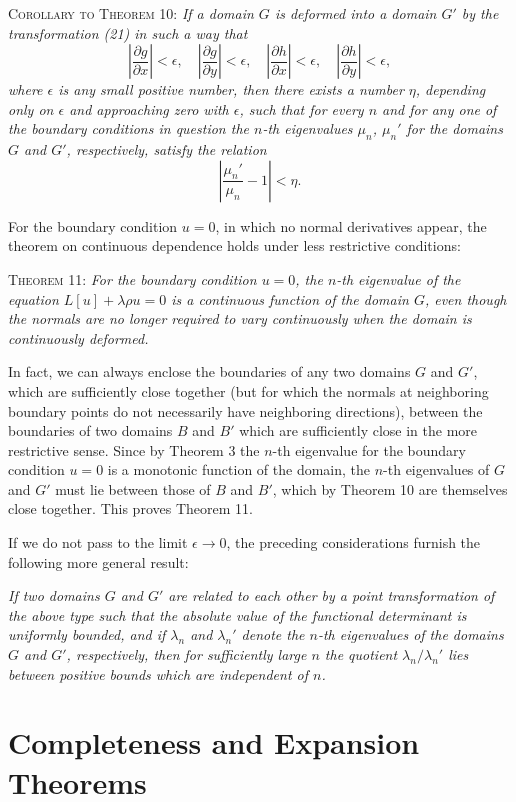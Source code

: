 \textsc{Corollary to Theorem 10:} \emph{If a domain $G$ is deformed into a domain $G'$ by the transformation (21) in such a way that}
\[
\left|\frac{\partial g}{\partial x}\right|<\epsilon,
\quad\left|\frac{\partial g}{\partial y}\right|<\epsilon,
\quad\left|\frac{\partial h}{\partial x}\right|<\epsilon,
\quad\left|\frac{\partial h}{\partial y}\right|<\epsilon,
\]
\emph{where $\epsilon$ is any small positive number, then there exists a number $\eta$, depending only on $\epsilon$ and approaching zero with $\epsilon$, such that for every $n$ and for any one of the boundary conditions in question the $n$-th eigenvalues $\mu_n$, $\mu_n'$ for the domains $G$ and $G'$, respectively, satisfy the relation}
\[
\left|\frac{\mu_n'}{\mu_n}-1\right|<\eta.
\]

For the boundary condition $u=0$, in which no normal derivatives appear, the theorem on continuous dependence holds under less restrictive conditions:

\textsc{Theorem 11:} \emph{For the boundary condition $u=0$, the $n$-th eigenvalue of the equation $L[u]+\lambda\rho u=0$ is a continuous function of the domain $G$, even though the normals are no longer required to vary continuously when the domain is continuously deformed.}

In fact, we can always enclose the boundaries of any two domains $G$ and $G'$, which are sufficiently close together (but for which the normals at neighboring boundary points do not necessarily have neighboring directions), between the boundaries of two domains $B$ and $B'$ which are sufficiently close in the more restrictive sense. Since by Theorem 3 the $n$-th eigenvalue for the boundary condition $u=0$ is a monotonic function of the domain, the $n$-th eigenvalues of $G$ and $G'$ must lie between those of $B$ and $B'$, which by Theorem 10 are themselves close together. This proves Theorem 11.

If we do not pass to the limit $\epsilon\to0$, the preceding considerations furnish the following more general result:

\emph{If two domains $G$ and $G'$ are related to each other by a point transformation of the above type such that the absolute value of the functional determinant is uniformly bounded, and if $\lambda_n$ and $\lambda_n'$ denote the $n$-th eigenvalues of the domains $G$ and $G'$, respectively, then for sufficiently large $n$ the quotient $\lambda_n/\lambda_n'$ lies between positive bounds which are independent of $n$.}

\section{Completeness and Expansion Theorems}
